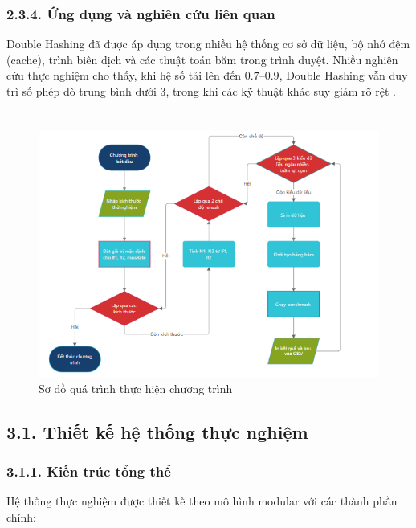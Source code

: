 \documentclass[12pt,a4paper]{report}
\begin{document}
\subsection*{2.3.4. Ứng dụng và nghiên cứu liên quan}
\noindent \indent Double Hashing đã được áp dụng trong nhiều hệ thống cơ sở dữ liệu, bộ nhớ đệm (cache), trình biên dịch và các thuật toán băm trong trình duyệt. Nhiều nghiên cứu thực nghiệm cho thấy, khi hệ số tải lên đến $0.7$–$0.9$, Double Hashing vẫn duy trì số phép dò trung bình dưới $3$, trong khi các kỹ thuật khác suy giảm rõ rệt \cite{weiss2012, khan2019}.

\newpage
\chapter*{}
\begin{figure}[!ht]
    \centering
    \includegraphics[width=1.0\textwidth]{fc.png}
    \caption{Sơ đồ quá trình thực hiện chương trình}
    \label{fig:flowchart}
\end{figure}
\section*{3.1. Thiết kế hệ thống thực nghiệm}
\subsection*{3.1.1. Kiến trúc tổng thể}
\noindent \indent Hệ thống thực nghiệm được thiết kế theo mô hình modular với các thành phần chính:
\end{document}
